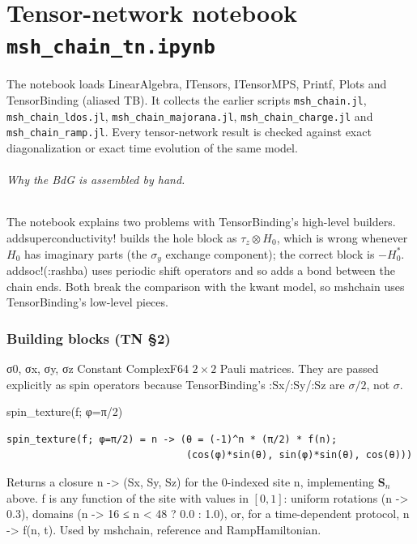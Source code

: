 \documentclass[11pt]{article}
\newcommand{\nb}[1]{\texttt{#1}}
\newcommand{\codeus}{\textunderscore\allowbreak}
\renewcommand{\code}[1]{{\ttfamily\let\_\codeus #1}}
\begin{document}
\clearpage
\part{Tensor-network notebook \texorpdfstring{\nb{msh\_chain\_tn.ipynb}}{msh\_chain\_tn.ipynb}}

The notebook loads \code{LinearAlgebra, ITensors, ITensorMPS, Printf, Plots} and \code{TensorBinding} (aliased \code{TB}). It collects the earlier scripts \nb{msh\_chain.jl}, \nb{msh\_chain\_ldos.jl}, \nb{msh\_chain\_majorana.jl}, \nb{msh\_chain\_charge.jl} and \nb{msh\_chain\_ramp.jl}. Every tensor-network result is checked against exact diagonalization or exact time evolution of the same model.

\paragraph{Why the BdG is assembled by hand.} The notebook explains two problems with TensorBinding's high-level builders. \code{add\_superconductivity!} builds the hole block as $\tau_z\otimes H_0$, which is wrong whenever $H_0$ has imaginary parts (the $\sigma_y$ exchange component); the correct block is $-H_0^*$. \code{add\_soc!(:rashba)} uses periodic shift operators and so adds a bond between the chain ends. Both break the comparison with the kwant model, so \code{msh\_chain} uses TensorBinding's low-level pieces.

\section{Building blocks (TN §2)}

\begin{function}{σ0, σx, σy, σz}
Constant \code{ComplexF64} $2\times2$ Pauli matrices. They are passed explicitly as spin operators because TensorBinding's \code{:Sx/:Sy/:Sz} are $\sigma/2$, not $\sigma$.
\end{function}

\begin{function}{spin\_texture(f; φ=π/2)}
\begin{Verbatim}
spin_texture(f; φ=π/2) = n -> (θ = (-1)^n * (π/2) * f(n);
                               (cos(φ)*sin(θ), sin(φ)*sin(θ), cos(θ)))
\end{Verbatim}
Returns a closure \code{n -> (Sx, Sy, Sz)} for the 0-indexed site \code{n}, implementing $\mathbf S_n$ above. \code{f} is any function of the site with values in $[0,1]$: uniform rotations (\code{n -> 0.3}), domains (\code{n -> 16 ≤ n < 48 ? 0.0 : 1.0}), or, for a time-dependent protocol, \code{n -> f(n, t)}. Used by \code{msh\_chain}, \code{reference} and \code{RampHamiltonian}.
\end{function}
\end{document}
